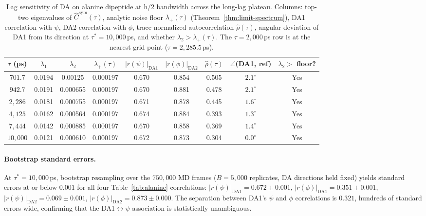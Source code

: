 \documentclass{article}
\begin{document}
\begin{table}[H]
\centering
\caption{  Lag sensitivity of DA on alanine dipeptide at h/2
bandwidth across the long-lag plateau. Columns: top-two eigenvalues
of $\hat C^{\mathrm{sym}}(\tau)$, analytic noise floor $\lambda_+(\tau)$
(Theorem~\ref{thm:limit-spectrum}),
DA1 correlation with $\psi$, DA2 correlation with $\phi$,
trace-normalized autocorrelation $\hat\rho(\tau)$, angular deviation
of DA1 from its direction at $\tau^* = 10{,}000$\,ps, and whether
$\lambda_2 > \lambda_+(\tau)$. The $\tau = 2{,}000$\,ps row is at
the nearest grid point ($\tau = 2{,}285.5$\,ps).}
\label{tab:alanine_lag_sensitivity}

\setlength{\tabcolsep}{4pt}
\begin{tabular}{@{}ccccccccc@{}}
\toprule
$\tau$ (ps) & $\lambda_1$ & $\lambda_2$ &
$\lambda_+(\tau)$ &
$|r(\psi)|_{\mathrm{DA1}}$ & $|r(\phi)|_{\mathrm{DA2}}$ &
$\hat\rho(\tau)$ & $\angle$(DA1, ref) & $\lambda_2 > $ floor? \\
\midrule
$701.7$    & 0.0194 & 0.00125  & 0.000197 & 0.670 & 0.854 & 0.505 & $2.1^\circ$ & Yes \\
$942.7$    & 0.0191 & 0.000655 & 0.000197 & 0.670 & 0.881 & 0.478 & $2.1^\circ$ & Yes \\
$2{,}286$  & 0.0181 & 0.000755 & 0.000197 & 0.671 & 0.878 & 0.445 & $1.6^\circ$ & Yes \\
$4{,}125$  & 0.0162 & 0.000564 & 0.000197 & 0.674 & 0.884 & 0.393 & $1.3^\circ$ & Yes \\
$7{,}444$  & 0.0142 & 0.000885 & 0.000197 & 0.670 & 0.858 & 0.369 & $1.4^\circ$ & Yes \\
$10{,}000$ & 0.0121 & 0.000610 & 0.000197 & 0.672 & 0.873 & 0.304 & $0.0^\circ$ & Yes \\
\bottomrule
\end{tabular}
\end{table}

\paragraph{Bootstrap standard errors.}
At $\tau^* = 10{,}000$\,ps, bootstrap resampling over the $750{,}000$ MD
frames ($B = 5{,}000$ replicates, DA directions held fixed) yields
standard errors at or below $0.001$ for all four Table~\ref{tab:alanine}
correlations: $|r(\psi)|_{\mathrm{DA1}} = 0.672 \pm 0.001$,
$|r(\phi)|_{\mathrm{DA1}} = 0.351 \pm 0.001$,
$|r(\psi)|_{\mathrm{DA2}} = 0.069 \pm 0.001$,
$|r(\phi)|_{\mathrm{DA2}} = 0.873 \pm 0.000$. The separation between
DA1's $\psi$ and $\phi$ correlations is $0.321$, hundreds of standard
errors wide, confirming that the DA1$\leftrightarrow\psi$ association
is statistically unambiguous.
\end{document}
